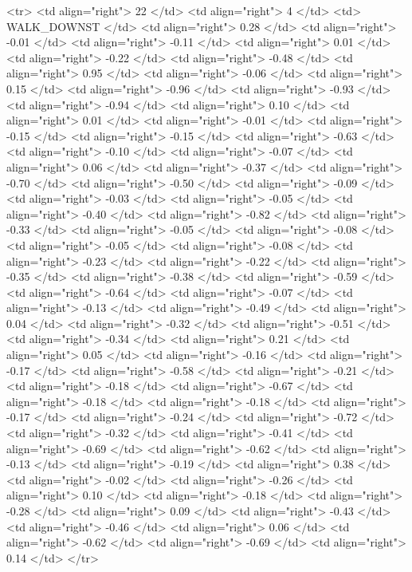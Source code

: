   <tr> <td align="right"> 22 </td> <td align="right">   4 </td> <td> WALK_DOWNST </td> <td align="right"> 0.28 </td> <td align="right"> -0.01 </td> <td align="right"> -0.11 </td> <td align="right"> 0.01 </td> <td align="right"> -0.22 </td> <td align="right"> -0.48 </td> <td align="right"> 0.95 </td> <td align="right"> -0.06 </td> <td align="right"> 0.15 </td> <td align="right"> -0.96 </td> <td align="right"> -0.93 </td> <td align="right"> -0.94 </td> <td align="right"> 0.10 </td> <td align="right"> 0.01 </td> <td align="right"> -0.01 </td> <td align="right"> -0.15 </td> <td align="right"> -0.15 </td> <td align="right"> -0.63 </td> <td align="right"> -0.10 </td> <td align="right"> -0.07 </td> <td align="right"> 0.06 </td> <td align="right"> -0.37 </td> <td align="right"> -0.70 </td> <td align="right"> -0.50 </td> <td align="right"> -0.09 </td> <td align="right"> -0.03 </td> <td align="right"> -0.05 </td> <td align="right"> -0.40 </td> <td align="right"> -0.82 </td> <td align="right"> -0.33 </td> <td align="right"> -0.05 </td> <td align="right"> -0.08 </td> <td align="right"> -0.05 </td> <td align="right"> -0.08 </td> <td align="right"> -0.23 </td> <td align="right"> -0.22 </td> <td align="right"> -0.35 </td> <td align="right"> -0.38 </td> <td align="right"> -0.59 </td> <td align="right"> -0.64 </td> <td align="right"> -0.07 </td> <td align="right"> -0.13 </td> <td align="right"> -0.49 </td> <td align="right"> 0.04 </td> <td align="right"> -0.32 </td> <td align="right"> -0.51 </td> <td align="right"> -0.34 </td> <td align="right"> 0.21 </td> <td align="right"> 0.05 </td> <td align="right"> -0.16 </td> <td align="right"> -0.17 </td> <td align="right"> -0.58 </td> <td align="right"> -0.21 </td> <td align="right"> -0.18 </td> <td align="right"> -0.67 </td> <td align="right"> -0.18 </td> <td align="right"> -0.18 </td> <td align="right"> -0.17 </td> <td align="right"> -0.24 </td> <td align="right"> -0.72 </td> <td align="right"> -0.32 </td> <td align="right"> -0.41 </td> <td align="right"> -0.69 </td> <td align="right"> -0.62 </td> <td align="right"> -0.13 </td> <td align="right"> -0.19 </td> <td align="right"> 0.38 </td> <td align="right"> -0.02 </td> <td align="right"> -0.26 </td> <td align="right"> 0.10 </td> <td align="right"> -0.18 </td> <td align="right"> -0.28 </td> <td align="right"> 0.09 </td> <td align="right"> -0.43 </td> <td align="right"> -0.46 </td> <td align="right"> 0.06 </td> <td align="right"> -0.62 </td> <td align="right"> -0.69 </td> <td align="right"> 0.14 </td> </tr>
